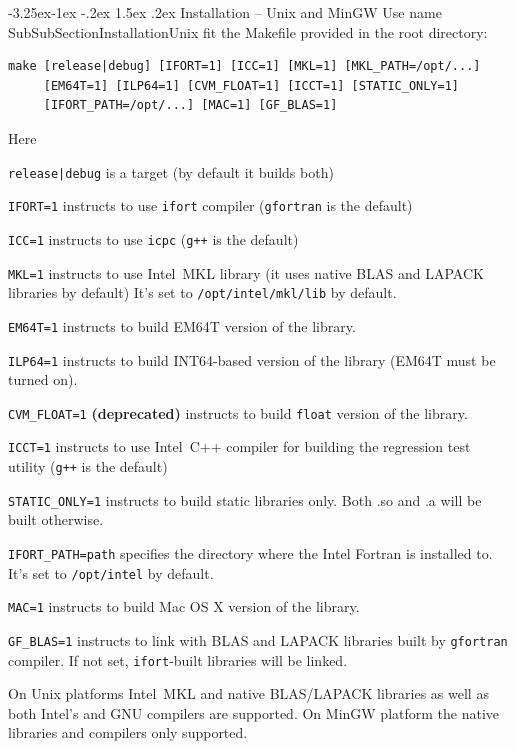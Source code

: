 \documentclass[12pt,letterpaper]{article}
\makeatletter
\renewcommand\subsubsection{\@startsection{subsubsection}{3}{0mm}%
                                     {-3.25ex\@plus -1ex \@minus -.2ex}%
                                     {1.5ex \@plus .2ex}%
                                     {\normalfont\normalsize\bfseries\sffamily}}
\makeatother
\begin{document}
\subsubsection{Installation -- Unix and MinGW}
Use%
\pdfdest name {SubSubSectionInstallationUnix} fit{}
the Makefile provided in the root directory:
\begin{Verbatim}
make [release|debug] [IFORT=1] [ICC=1] [MKL=1] [MKL_PATH=/opt/...] 
     [EM64T=1] [ILP64=1] [CVM_FLOAT=1] [ICCT=1] [STATIC_ONLY=1]
     [IFORT_PATH=/opt/...] [MAC=1] [GF_BLAS=1]
\end{Verbatim}
Here
\begin{compactitem}
\item \verb'release|debug' is a target (by default it builds both)
\item \verb'IFORT=1' instructs to use \verb"ifort"
compiler (\verb'gfortran' is the default)
\item \verb'ICC=1' instructs to use \verb"icpc"
(\verb'g++' is the default)
\item \verb'MKL=1' instructs to use Intel~MKL library (it uses
  native BLAS and LAPACK libraries by default)
It's set to \verb'/opt/intel/mkl/lib' by default.
\item \verb'EM64T=1' instructs to build EM64T version of the library.
\item \verb'ILP64=1' instructs to build INT64-based version of the library (EM64T must be turned on).
\item \verb'CVM_FLOAT=1' \textbf{(deprecated)} instructs to build \verb'float' version of the library.
\item \verb'ICCT=1' instructs to use Intel~C++ compiler for building the
regression test utility (\verb'g++' is the default)
\item \verb'STATIC_ONLY=1' instructs to build static libraries only.
Both .so and .a will be built otherwise.
\item \verb'IFORT_PATH=path' specifies the directory where the Intel Fortran is installed to. 
It's set to \verb"/opt/intel" by default.
\item \verb'MAC=1' instructs to build Mac OS X version of the library.
\item \verb'GF_BLAS=1' instructs to link with BLAS and LAPACK libraries built by 
\verb'gfortran' compiler. If not set, \verb'ifort'-built libraries will be linked.
\end{compactitem}
On Unix platforms Intel~MKL and native BLAS/LAPACK libraries as well
as both Intel's and GNU compilers are supported. On MinGW platform the native libraries and
compilers only supported.
\end{document}
